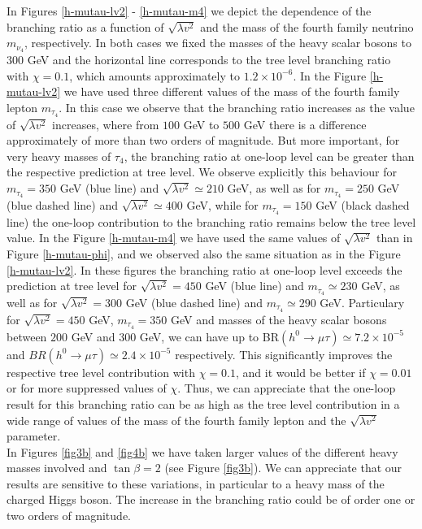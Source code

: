 \documentclass[a4paper]{jpconf}
\begin{document}
In Figures \ref{h-mutau-lv2} - \ref{h-mutau-m4} we depict the dependence of the branching ratio as a function of $\sqrt{\lambda v^2}$ and the mass of the fourth family neutrino $m_{\nu_4}$, respectively. In both cases we fixed the masses of the heavy scalar bosons to $300$ GeV and the horizontal line corresponds to the tree level branching ratio with $\chi=0.1$, which amounts approximately to $1.2\times10^{-6}$. In the Figure \ref{h-mutau-lv2} we have used three different values of the
mass of the fourth family lepton $m_{\tau_4}$. In this case  we observe that the branching ratio increases as the value of $\sqrt{\lambda v^2}$ increases, where from $100$ GeV to $500$ GeV there is a difference approximately of more than two orders of magnitude. But more important, for very heavy masses of $\tau_4$, the branching ratio at one-loop level can be greater than the respective prediction at
tree level. We observe explicitly this behaviour for $m_{\tau_4}=350$ GeV (blue line) and $\sqrt{\lambda  v^2} \simeq 210$ GeV, as well as for $m_{\tau_4}=250$ GeV (blue dashed line) and $\sqrt{\lambda v^2}\simeq 400$ GeV, while for $m_{\tau_4}=150$ GeV (black dashed line)  the one-loop contribution to the branching ratio remains below the tree level value. In the Figure \ref{h-mutau-m4} we have used the same values of $\sqrt{\lambda v^2}$ than in Figure \ref{h-mutau-phi}, and we observed also the same  situation as in the Figure \ref{h-mutau-lv2}. In these figures the branching ratio at one-loop level exceeds the prediction  at tree level for $\sqrt{\lambda v^2}=450$ GeV (blue line) and $m_{\tau_4}\simeq 230$ GeV, as well as for $\sqrt{\lambda v^2}=300$ GeV (blue dashed line) and $m_{\tau_4}\simeq 290$ GeV. Particulary for $\sqrt{\lambda v^2}=450$ GeV, $m_{\tau_4}=350$ GeV and masses of the heavy scalar bosons between $200$ GeV and $300$ GeV, we can have up to BR$(h^0\to \mu\tau)\simeq 7.2\times 10^{-5}$ and $BR(h^0\to \mu\tau)\simeq 2.4\times 10^{-5}$ respectively. This significantly improves the respective tree level contribution with $\chi=0.1$, and it would be better if $\chi=0.01$ or for more suppressed values of $\chi$. Thus, we can appreciate that the one-loop result for this branching ratio can be as high as the tree level contribution in a wide range of values of the mass of the fourth family lepton and the $\sqrt{\lambda v^2}$ parameter.\\
 In Figures \ref{fig3b} and \ref{fig4b} we have taken larger values of the different heavy masses involved and $\tan\beta=2$ (see Figure \ref{fig3b}). We can appreciate that our results are sensitive to these variations, in particular to a heavy mass of the charged Higgs boson. The increase in the branching ratio could be of order one or two orders of magnitude.\\
\end{document}
